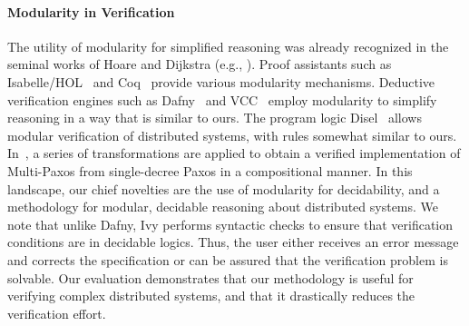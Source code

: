 \paragraph{Modularity in Verification}
The utility of modularity for simplified reasoning was already
recognized in the seminal works of Hoare and Dijkstra (e.g.,
\cite{Hoare:DataRepCorrectness}). Proof assistants such as
Isabelle/HOL~\cite{nipkow_isabelle/hol:_2002} and Coq~\cite{coq}
provide various modularity mechanisms. Deductive
verification engines such as Dafny~\cite{Dafny} and VCC~\cite{VCC} employ modularity to
simplify reasoning in a way that is similar to ours. The program logic
Disel~\cite{disel}
allows modular verification of
distributed systems, with rules somewhat similar to ours.
In~\cite{paxos_destructed_abstracted}, a series of transformations are
applied to obtain a verified implementation of Multi-Paxos from
single-decree Paxos in a compositional manner.
%
In this landscape, our chief novelties are the use of modularity for
decidability, and a methodology for modular, decidable reasoning about
distributed systems. We note that unlike Dafny, Ivy performs syntactic
checks to ensure that verification conditions are in decidable
logics. Thus, the user either receives an error message and corrects
the specification or can be assured that the verification problem is
solvable. Our evaluation demonstrates that our methodology is useful
for verifying complex distributed systems, and that it drastically
reduces the verification effort.
%
%
%
%
%
%
%
%
%
%
%
%
